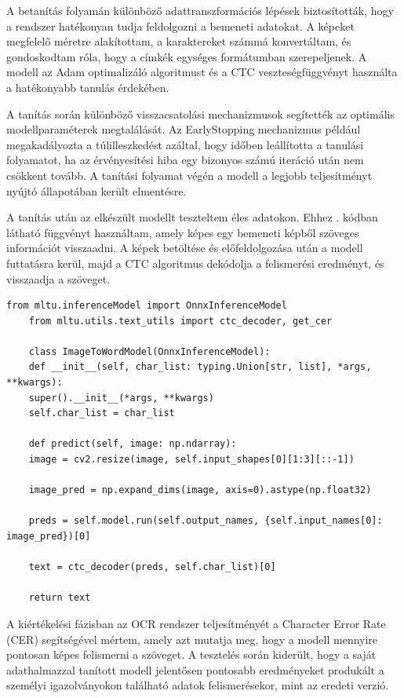 \documentclass[
]{thesis-ekf}
\theoremstyle{definition}
\theoremstyle{remark}
\begin{document}
A betanítás folyamán különböző adattranszformációs lépések biztosították, hogy a rendszer hatékonyan tudja feldolgozni a bemeneti adatokat. A képeket megfelelő méretre alakítottam, a karaktereket számmá konvertáltam, és gondoskodtam róla, hogy a címkék egységes formátumban szerepeljenek. A modell az Adam optimalizáló algoritmust és a CTC veszteségfüggvényt használta a hatékonyabb tanulás érdekében.

A tanítás során különböző visszacsatolási mechanizmusok segítették az optimális modellparaméterek megtalálását. Az EarlyStopping mechanizmus például megakadályozta a túlilleszkedést azáltal, hogy időben leállította a tanulási folyamatot, ha az érvényesítési hiba egy bizonyos számú iteráció után nem csökkent tovább. A tanítási folyamat végén a modell a legjobb teljesítményt nyújtó állapotában került elmentésre.

A tanítás után az elkészült modellt teszteltem éles adatokon. Ehhez . kódban látható függvényt használtam, amely képes egy bemeneti képből szöveges információt visszaadni. A képek betöltése és előfeldolgozása után a modell futtatásra kerül, majd a CTC algoritmus dekódolja a felismerési eredményt, és visszaadja a szöveget.

\begin{lstlisting}[style=mypython,caption=Konfigurációs fájl, label=kod-python4]
	from mltu.inferenceModel import OnnxInferenceModel
	from mltu.utils.text_utils import ctc_decoder, get_cer
	
	class ImageToWordModel(OnnxInferenceModel):
	def __init__(self, char_list: typing.Union[str, list], *args, **kwargs):
	super().__init__(*args, **kwargs)
	self.char_list = char_list
	
	def predict(self, image: np.ndarray):
	image = cv2.resize(image, self.input_shapes[0][1:3][::-1])
	
	image_pred = np.expand_dims(image, axis=0).astype(np.float32)
	
	preds = self.model.run(self.output_names, {self.input_names[0]: image_pred})[0]
	
	text = ctc_decoder(preds, self.char_list)[0]
	
	return text
\end{lstlisting}

A kiértékelési fázisban az OCR rendszer teljesítményét a Character Error Rate (CER) segítségével mértem, amely azt mutatja meg, hogy a modell mennyire pontosan képes felismerni a szöveget. A tesztelés során kiderült, hogy a saját adathalmazzal tanított modell jelentősen pontosabb eredményeket produkált a személyi igazolványokon található adatok felismerésekor, mint az eredeti verzió.
\end{document}
